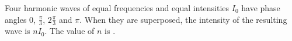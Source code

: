 
\item Four harmonic waves of equal frequencies and equal intensities \(I_0\) have phase angles \(0\), \(\frac{\pi}{3}\), \(2\frac{\pi}{3}\) and \(\pi\). When they are superposed, the intensity of the resulting wave is \(nI_0\). The value of \(n\) is \underline{\hspace{2.5 cm}}.

